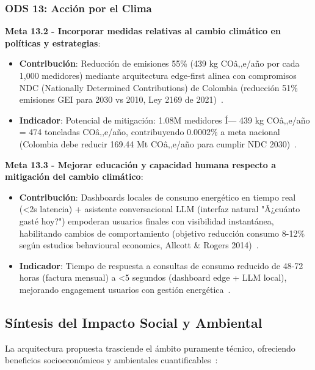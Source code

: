 \subsubsection{ODS 13: Acción por el Clima}

\textbf{Meta 13.2 - Incorporar medidas relativas al cambio climático en políticas y estrategias}:
\begin{itemize}
    \item \textbf{Contribución}: Reducción de emisiones 55\% (439 kg COâ‚‚e/año por cada 1,000 medidores) mediante arquitectura edge-first alinea con compromisos NDC (Nationally Determined Contributions) de Colombia (reducción 51\% emisiones GEI para 2030 vs 2010, Ley 2169 de 2021)~\cite{cohenEdgeComputingEnabled2024,shenAugmentingEdgeIntelligence2024}.
    \item \textbf{Indicador}: Potencial de mitigación: 1.08M medidores Í— 439 kg COâ‚‚e/año = 474 toneladas COâ‚‚e/año, contribuyendo 0.0002\% a meta nacional (Colombia debe reducir 169.44 Mt COâ‚‚e/año para cumplir NDC 2030)~\cite{wulurCoordinationEdgeCloud2024}.
\end{itemize}

\textbf{Meta 13.3 - Mejorar educación y capacidad humana respecto a mitigación del cambio climático}:
\begin{itemize}
    \item \textbf{Contribución}: Dashboards locales de consumo energético en tiempo real (<2s latencia) + asistente conversacional LLM (interfaz natural "Â¿cuánto gasté hoy?") empoderan usuarios finales con visibilidad instantánea, habilitando cambios de comportamiento (objetivo reducción consumo 8-12\% según estudios behavioural economics, Allcott \& Rogers 2014)~\cite{saidiIoTGatewayPowered2024,amezcuavaldovinosDesignImplementationEvaluation2024}.
    \item \textbf{Indicador}: Tiempo de respuesta a consultas de consumo reducido de 48-72 horas (factura mensual) a <5 segundos (dashboard edge + LLM local), mejorando engagement usuarios con gestión energética~\cite{boonmeerukCostEffectiveIIoTGateway2024,abowardahEdgeComputingIoT2024}.
\end{itemize}

\subsection{Síntesis del Impacto Social y Ambiental}

La arquitectura propuesta trasciende el ámbito puramente técnico, ofreciendo beneficios socioeconómicos y ambientales cuantificables~\cite{ashfaqIoTSensorNetworks2024,InternetThingsIoT2024,laghariInternetThingsIoT2024}:

